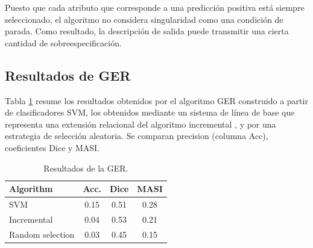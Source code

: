 Puesto que cada atributo que corresponde a una predicci\'on positiva est\'a siempre seleccionado, el algoritmo no considera singularidad como una condici\'on de parada. Como resultado, la descripci\'on de salida puede transmitir una cierta cantidad de sobreespecificaci\'on.


\subsection{Resultados de GER }

Tabla \ref{tab-reg-results} resume los resultados obtenidos por el algoritmo GER construido a partir de clasificadores SVM, los obtenidos mediante un sistema de l\'{i}nea de base que representa una extensi\'on relacional del algoritmo incremental \cite{incremental}, y por una estrategia de selecci\'on aleatoria. Se comparan precision (columna Acc), coeficientes Dice y MASI.

\begin{table}[H]
\begin{center}
\begin{tabular} {  l c c c }
\hline
{Algorithm}							& {Acc.} 	& { Dice}		& MASI \\ \hline 
SVM											& 0.15		& 0.51			& 0.28 \\
Incremental							& 0.04		& 0.53			& 0.21 \\
Random selection       	& 0.03    & 0.45      & 0.15 \\
\hline
\end{tabular}
\end{center}
\caption{Resultados de la GER.}
\label{tab-reg-results}

\end{table}




